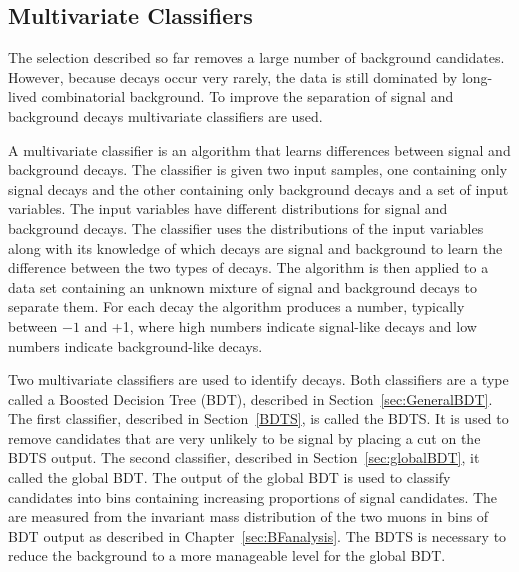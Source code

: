 \subsection{Multivariate Classifiers}
\label{sec:MVC}

The selection described so far removes a large number of background candidates. However, because \bmumu decays occur very rarely, the data is still dominated by long-lived combinatorial background. To improve the separation of signal and background decays multivariate classifiers are used.

A multivariate classifier is an algorithm that learns differences between signal and background decays. The classifier is given two input samples, one containing only signal decays and the other containing only background decays and a set of input variables. The input variables have different distributions for signal and background decays. The classifier uses the distributions of the input variables along with its knowledge of which decays are signal and background to learn the difference between the two types of decays. The algorithm is then applied to a data set containing an unknown mixture of signal and background decays to separate them. For each decay the algorithm produces a number, typically between $-1$ and +1, where high numbers indicate signal-like decays and low numbers indicate background-like decays. %

Two multivariate classifiers are used to identify \bmumu decays. Both classifiers are a type called a Boosted Decision Tree (BDT), described in Section~\ref{sec:GeneralBDT}. %
The first classifier, described in Section~\ref{BDTS}, is called the BDTS. It is used to remove candidates that are very unlikely to be signal by placing a cut on the BDTS output. %
The second classifier, described in Section~\ref{sec:globalBDT}, it called the global BDT. The output of the global BDT is used to classify candidates into bins containing increasing proportions of signal candidates. The \BFs are measured from the invariant mass distribution of the two muons in bins of BDT output as described in Chapter~\ref{sec:BFanalysis}. %
The BDTS is necessary to reduce the background to a more manageable level for the global BDT.

